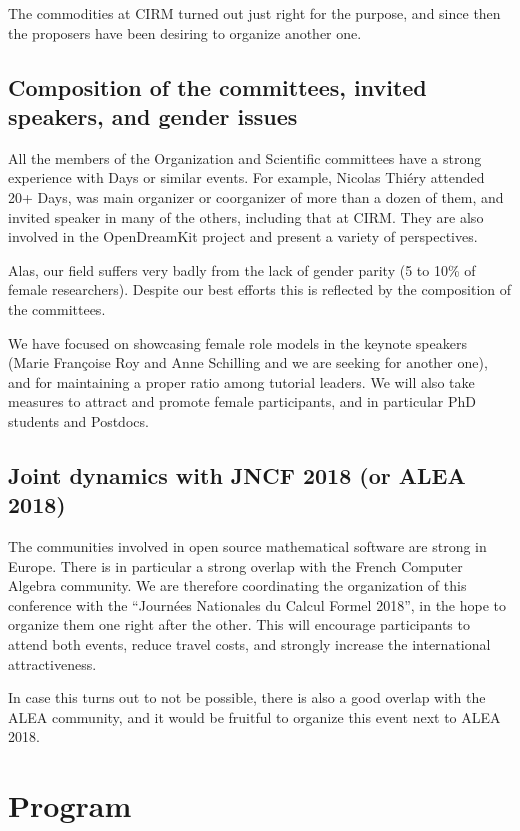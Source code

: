 \documentclass[12pt]{amsart}
\begin{document}
The commodities at CIRM turned out just right for the purpose, and
since then the proposers have been desiring to organize another one.

\subsection{Composition of the committees, invited speakers, and gender issues}

All the members of the Organization and Scientific committees have a
strong experience with \Sage Days or similar events. For example,
Nicolas Thiéry attended 20+ \Sage Days, was main organizer or
coorganizer of more than a dozen of them, and invited speaker in many
of the others, including that at CIRM. They are also involved in the
OpenDreamKit project and present a variety of perspectives.

Alas, our field suffers very badly from the lack of gender parity (5
to 10\% of female researchers). Despite our best efforts this is reflected by the
composition of the committees.

We have focused on showcasing female role models in the keynote
speakers (Marie Françoise Roy and Anne Schilling and we are seeking
for another one), and for maintaining a proper ratio among tutorial
leaders. We will also take measures to attract and promote female
participants, and in particular PhD students and Postdocs.

\subsection{Joint dynamics with JNCF 2018 (or ALEA 2018)}

The communities involved in open source mathematical software are
strong in Europe. There is in particular a strong overlap with the
French Computer Algebra community. We are therefore coordinating the
organization of this conference with the ``Journées Nationales du
Calcul Formel 2018'', in the hope to organize them one right after the
other. This will encourage participants to attend both events, reduce
travel costs, and strongly increase the international attractiveness.

In case this turns out to not be possible, there is also a good
overlap with the ALEA community, and it would be fruitful to organize
this event next to ALEA 2018.

\section{Program}
\end{document}
